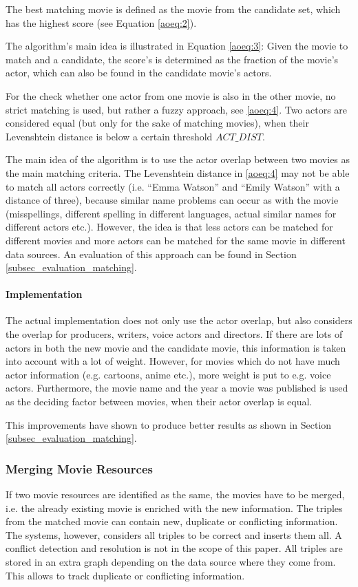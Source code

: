 The best matching movie is defined as the movie from the candidate set, which has the highest score (see Equation \ref{aoeq:2}).

The algorithm's main idea is illustrated in Equation \ref{aoeq:3}: Given the movie to match and a candidate, the score's is determined as the fraction of the movie's actor, which can also be found in the candidate movie's actors.

For the check whether one actor from one movie is also in the other movie, no strict matching is used, but rather a fuzzy approach, see \ref{aoeq:4}.
Two actors are considered equal (but only for the sake of matching movies), when their Levenshtein distance is below a certain threshold $ACT\_DIST$.

The main idea of the algorithm is to use the actor overlap between two movies as the main matching criteria.
The Levenshtein distance in \ref{aoeq:4} may not be able to match all actors correctly (i.e. "`Emma Watson"' and "`Emily Watson"' with a distance of three), because similar name problems can occur as with the movie (misspellings, different spelling in different languages, actual similar names for different actors etc.).
However, the idea is that less actors can be matched for different movies and more actors can be matched for the same movie in different data sources.
An evaluation of this approach can be found in Section \ref{subsec_evaluation_matching}.

\paragraph{Implementation}
The actual implementation does not only use the actor overlap, but also considers the overlap for producers, writers, voice actors and directors.
If there are lots of actors in both the new movie and the candidate movie, this information is taken into account with a lot of weight.
However, for movies which do not have much actor information (e.g. cartoons, anime etc.), more weight is put to e.g. voice actors.
Furthermore, the movie name and the year a movie was published is used as the deciding factor between movies, when their actor overlap is equal.

This improvements have shown to produce better results as shown in Section \ref{subsec_evaluation_matching}.

\subsubsection{Merging Movie Resources}

If two movie resources are identified as the same, the movies have to be merged, i.e. the already existing movie is enriched with the new information.
The triples from the matched movie can contain new, duplicate or conflicting information.
The systems, however, considers all triples to be correct and inserts them all.
A conflict detection and resolution is not in the scope of this paper.
All triples are stored in an extra graph depending on the data source where they come from.
This allows to track duplicate or conflicting information.